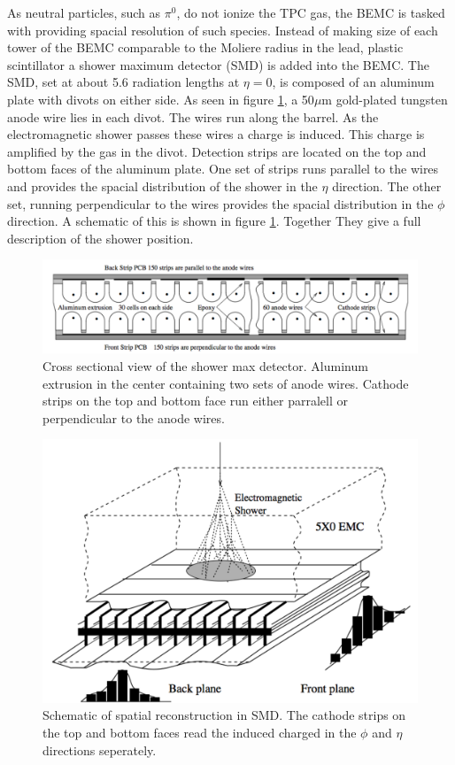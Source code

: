 \documentclass[abstract = on,listof=totoc, bibliography=totoc]{scrreprt}
\begin{document}
As neutral particles, such as $\pi^0$, do not ionize the TPC gas, the BEMC is tasked with providing spacial resolution of such species. Instead of making size of each tower of the BEMC comparable to the Moliere radius in the lead, plastic scintillator a shower maximum detector (SMD) is added into the BEMC. The SMD, set at about 5.6 radiation lengths at $\eta=0$, is composed of an aluminum plate with divots on either side. As seen in figure \ref{fig:SMD2}, a 50$\mu$m gold-plated tungsten anode wire lies in each divot. The wires run along the barrel. As the electromagnetic shower passes these wires a charge is induced. This charge is amplified by the gas in the divot. Detection strips are located on the top and bottom faces of the aluminum plate. One set of strips runs parallel to the wires and provides the spacial distribution of the shower in the $\eta$ direction. The other set, running perpendicular to the wires provides the spacial distribution in the $\phi$ direction. A schematic of this is shown in figure \ref{fig:SMD2}. Together They give a full description of the shower position.\cite{BEMC}

\begin{figure}
\begin{center}
\includegraphics[width = .6\textwidth]{SMD2}
\caption[Shower Maximum Detector cross sectional view]{Cross sectional view of the shower max detector. Aluminum extrusion in the center containing two sets of anode wires. Cathode strips on the top and bottom face run either parralell or perpendicular to the anode wires.}
\label{fig:SMD2}
\end{center}
\end{figure}

\begin{figure}
\begin{center}
\includegraphics[width = .6\textwidth]{SMD1}
\caption[Spatial reconstruction in the SMD]{Schematic of spatial reconstruction in SMD. The cathode strips on the top and bottom faces read the induced charged in the $\phi$ and $\eta$ directions seperately.}
\label{fig:SMD1}
\end{center}
\end{figure}
\end{document}
